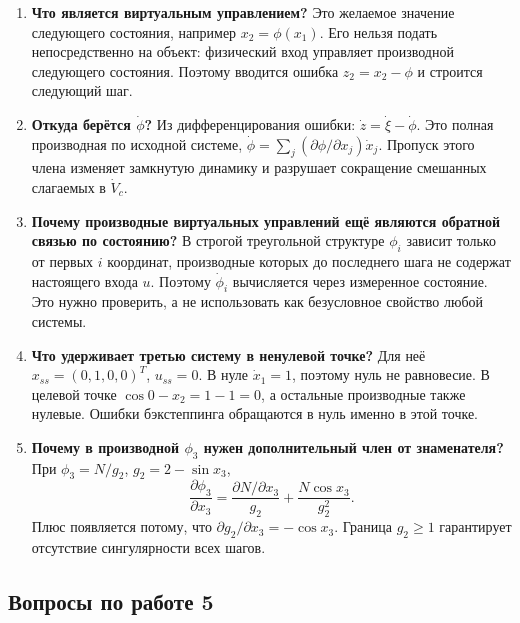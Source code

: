 \begin{enumerate}[resume]
\item \textbf{Что является виртуальным управлением?}
Это желаемое значение следующего состояния, например $x_2=\phi(x_1)$.
Его нельзя подать непосредственно на объект: физический вход управляет
производной следующего состояния. Поэтому вводится ошибка
$z_2=x_2-\phi$ и строится следующий шаг.

\item \textbf{Откуда берётся $\dot\phi$?}
Из дифференцирования ошибки: $\dot z=\dot\xi-\dot\phi$.
Это полная производная по исходной системе,
$\dot\phi=\sum_j(\partial\phi/\partial x_j)\dot x_j$.
Пропуск этого члена изменяет замкнутую динамику и разрушает сокращение
смешанных слагаемых в $\dot V_c$.

\item \textbf{Почему производные виртуальных управлений ещё являются обратной связью по состоянию?}
В строгой треугольной структуре $\phi_i$ зависит только от первых $i$
координат, производные которых до последнего шага не содержат настоящего
входа $u$. Поэтому $\dot\phi_i$ вычисляется через измеренное состояние.
Это нужно проверить, а не использовать как безусловное свойство любой системы.

\item \textbf{Что удерживает третью систему в ненулевой точке?}
Для неё $x_{ss}=(0,1,0,0)^T$, \mbox{$u_{ss}=0$}. В нуле $\dot x_1=1$,
поэтому нуль не равновесие. В целевой точке $\cos0-x_2=1-1=0$,
а остальные производные также нулевые. Ошибки бэкстеппинга обращаются
в нуль именно в этой точке.

\item \textbf{Почему в производной $\phi_3$ нужен дополнительный член от знаменателя?}
При $\phi_3=N/g_2$, $g_2=2-\sin x_3$,
\[
 \frac{\partial\phi_3}{\partial x_3}
 =\frac{\partial N/\partial x_3}{g_2}
  +\frac{N\cos x_3}{g_2^2}.
\]
Плюс появляется потому, что $\partial g_2/\partial x_3=-\cos x_3$.
Граница $g_2\ge1$ гарантирует отсутствие сингулярности всех шагов.
\end{enumerate}

\subsection{Вопросы по работе 5}

